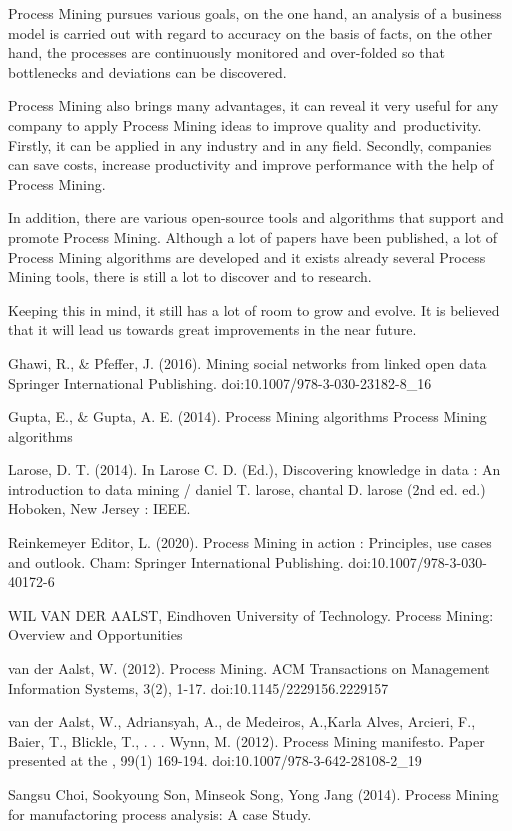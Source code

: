 \documentclass[conference]{IEEEtran}
\begin{document}
Process Mining pursues various goals, on the one hand, an analysis of a business model is carried out with regard to accuracy on the basis of facts, on the other hand, the processes are continuously monitored and over-folded so that bottlenecks and deviations can be discovered.

Process Mining also brings many advantages, it can reveal it very useful for any company to apply Process Mining ideas to improve quality and productivity. Firstly, it can be applied in any industry and in any field. Secondly, companies can save costs, increase productivity and improve performance with the help of Process Mining.

In addition, there are various open-source tools and algorithms that support and promote Process Mining. Although a lot of papers have been published, a lot of Process Mining algorithms are developed and it exists already several Process Mining tools, there is still a lot to discover and to research.

Keeping this in mind, it still has a lot of room to grow and evolve. It is believed that it will lead us towards great improvements in the near future.

\begin{thebibliography}{00}

 Ghawi, R., \& Pfeffer, J. (2016). Mining social networks from linked open data Springer International Publishing. doi:10.1007/978-3-030-23182-8\_16

 Gupta, E., \& Gupta, A. E. (2014). Process Mining algorithms Process Mining algorithms

 Larose, D. T. (2014). In Larose C. D. (Ed.), Discovering knowledge in data : An introduction to data mining / daniel T. larose, chantal D. larose (2nd ed. ed.) Hoboken, New Jersey : IEEE.

 Reinkemeyer Editor, L. (2020). Process Mining in action : Principles, use cases and outlook. Cham: Springer International Publishing. doi:10.1007/978-3-030-40172-6 

 WIL VAN DER AALST, Eindhoven University of Technology. Process Mining: Overview and Opportunities

 van der Aalst, W. (2012). Process Mining. ACM Transactions on Management Information Systems, 3(2), 1-17. doi:10.1145/2229156.2229157

 van der Aalst, W., Adriansyah, A., de Medeiros, A.,Karla Alves, Arcieri, F., Baier, T., Blickle, T., . . . Wynn, M. (2012). Process Mining manifesto. Paper presented at the , 99(1) 169-194. doi:10.1007/978-3-642-28108-2\_19

 Sangsu Choi, Sookyoung Son, Minseok Song, Yong Jang (2014). Process Mining for manufactoring process analysis: A case Study.  

\end{thebibliography}
\end{document}
